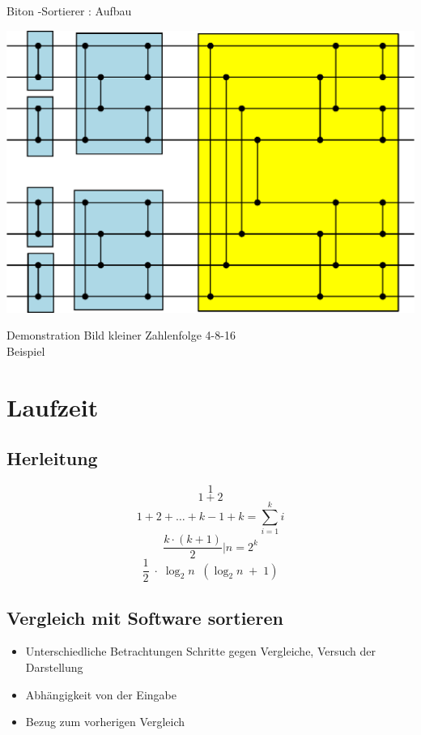 \documentclass[ucs,9pt]{beamer}
\begin{document}
\begin{frame}{Biton -Sortierer : Aufbau}
    \begin{center}
    		\includegraphics[scale=0.6]{biton2.eps}
    \end{center}
\end{frame}

\begin{frame}{Demonstration}
    Bild kleiner Zahlenfolge 4-8-16\\
    Beispiel
\end{frame}

\section{Laufzeit}
\subsection{Herleitung}
\begin{frame}
 {$$ 1 $$}
 {$$ 1 + 2 $$ }
 {$$ 1 + 2 + … + k-1 + k  = \sum_{i=1}^k i$$ }
 {$$ \frac{k \cdot (k+1)}{2} | n = 2^k $$}
 {$$ \frac{1}{2}\; \cdot\;\log_2 n \;\; (\log_2 n\;+\;1)$$}
\end{frame}

\subsection{Vergleich mit Software sortieren}
\begin{frame}
	\begin{itemize}
		\item Unterschiedliche Betrachtungen Schritte gegen Vergleiche, Versuch der Darstellung
	 	\item Abhängigkeit von der Eingabe
	 	\item Bezug zum vorherigen Vergleich
	\end{itemize}
\end{frame}
\end{document}
